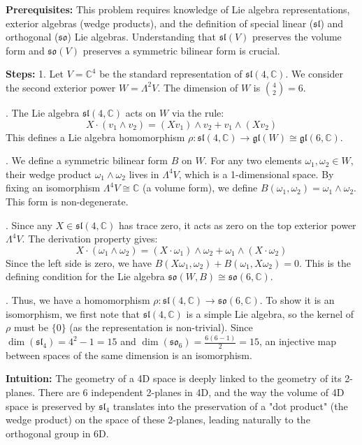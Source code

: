 \begin{solution}
\textbf{Prerequisites:}
This problem requires knowledge of Lie algebra representations, exterior algebras (wedge products), and the definition of special linear ($\mathfrak{sl}$) and orthogonal ($\mathfrak{so}$) Lie algebras. Understanding that $\mathfrak{sl}(V)$ preserves the volume form and $\mathfrak{so}(V)$ preserves a symmetric bilinear form is crucial.

\medskip
\textbf{Steps:}
1. Let $V = \mathbb{C}^4$ be the standard representation of $\mathfrak{sl}(4, \mathbb{C})$. We consider the second exterior power $W = \Lambda^2 V$. The dimension of $W$ is $\binom{4}{2} = 6$.

. The Lie algebra $\mathfrak{sl}(4, \mathbb{C})$ acts on $W$ via the rule:
$$X \cdot (v_1 \wedge v_2) = (X v_1) \wedge v_2 + v_1 \wedge (X v_2)$$
This defines a Lie algebra homomorphism $\rho: \mathfrak{sl}(4, \mathbb{C}) \to \mathfrak{gl}(W) \cong \mathfrak{gl}(6, \mathbb{C})$.

. We define a symmetric bilinear form $B$ on $W$. For any two elements $\omega_1, \omega_2 \in W$, their wedge product $\omega_1 \wedge \omega_2$ lives in $\Lambda^4 V$, which is a 1-dimensional space. By fixing an isomorphism $\Lambda^4 V \cong \mathbb{C}$ (a volume form), we define $B(\omega_1, \omega_2) = \omega_1 \wedge \omega_2$. This form is non-degenerate.

. Since any $X \in \mathfrak{sl}(4, \mathbb{C})$ has trace zero, it acts as zero on the top exterior power $\Lambda^4 V$. The derivation property gives:
$$X \cdot (\omega_1 \wedge \omega_2) = (X \cdot \omega_1) \wedge \omega_2 + \omega_1 \wedge (X \cdot \omega_2)$$
Since the left side is zero, we have $B(X \omega_1, \omega_2) + B(\omega_1, X \omega_2) = 0$. This is the defining condition for the Lie algebra $\mathfrak{so}(W, B) \cong \mathfrak{so}(6, \mathbb{C})$.

. Thus, we have a homomorphism $\rho: \mathfrak{sl}(4, \mathbb{C}) \to \mathfrak{so}(6, \mathbb{C})$. To show it is an isomorphism, we first note that $\mathfrak{sl}(4, \mathbb{C})$ is a simple Lie algebra, so the kernel of $\rho$ must be $\{0\}$ (as the representation is non-trivial). Since $\dim(\mathfrak{sl}_4) = 4^2 - 1 = 15$ and $\dim(\mathfrak{so}_6) = \frac{6(6-1)}{2} = 15$, an injective map between spaces of the same dimension is an isomorphism.

\medskip
\textbf{Intuition:}
The geometry of a 4D space is deeply linked to the geometry of its 2-planes. There are 6 independent 2-planes in 4D, and the way the volume of 4D space is preserved by $\mathfrak{sl}_4$ translates into the preservation of a "dot product" (the wedge product) on the space of these 2-planes, leading naturally to the orthogonal group in 6D.
\end{solution}

